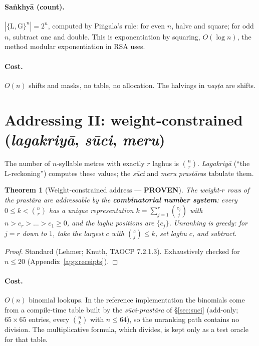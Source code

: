 \documentclass[11pt,letterpaper]{article}
\newcommand{\tagbox}[2]{\textsf{\textbf{\color{#1}#2}}}
\newcommand{\PROVEN}{\tagbox{tagproven}{PROVEN}}
\newcommand{\skt}[1]{\textit{#1}}
\theoremstyle{plain}
\newtheorem{theorem}{Theorem}
\theoremstyle{remark}
\begin{document}
\paragraph{Saṅkhyā (count).} $|\{\mathrm{L},\mathrm{G}\}^n| = 2^n$, computed by Piṅgala's rule: for even $n$, halve and square; for odd $n$, subtract one and double. This is exponentiation by squaring, $O(\log n)$, the method modular exponentiation in RSA uses.

\paragraph{Cost.} $O(n)$ shifts and masks, no table, no allocation. The halvings in \skt{naṣṭa} are shifts.

\section{Addressing II: weight-constrained (\skt{lagakriyā}, \skt{sūci}, \skt{meru})}\label{sec:weight}

The number of $n$-syllable metres with exactly $r$ laghus is $\binom{n}{r}$. \skt{Lagakriyā} (``the L-reckoning'') computes these values; the \skt{sūci} and \skt{meru} \skt{prastāra}s tabulate them.

\begin{theorem}[Weight-constrained address \textup{---} \PROVEN]\label{thm:comb}
The weight-$r$ rows of the \skt{prastāra} are addressable by the \textbf{combinatorial number system}: every $0 \le k < \binom{n}{r}$ has a unique representation $k = \sum_{j=1}^{r} \binom{c_j}{j}$ with $n > c_r > \dots > c_1 \ge 0$, and the laghu positions are $\{c_j\}$. Unranking is greedy: for $j = r$ down to $1$, take the largest $c$ with $\binom{c}{j} \le k$, set laghu $c$, and subtract.
\end{theorem}
\begin{proof}
Standard (Lehmer; Knuth, TAOCP 7.2.1.3). Exhaustively checked for $n \le 20$ (Appendix~\ref{app:receipts}).
\end{proof}

\paragraph{Cost.} $O(n)$ binomial lookups. In the reference implementation the binomials come from a compile-time table built by the \skt{sūci-prastāra} of §\ref{sec:suci} (add-only; $65 \times 65$ entries, every $\binom{n}{k}$ with $n \le 64$), so the unranking path contains no division. The multiplicative formula, which divides, is kept only as a test oracle for that table.
\end{document}
